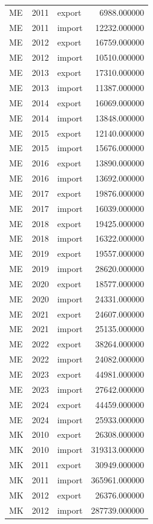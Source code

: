 \begin{tabular}{lrlr}
ME & 2011 & export & 6988.000000 \\
ME & 2011 & import & 12232.000000 \\
ME & 2012 & export & 16759.000000 \\
ME & 2012 & import & 10510.000000 \\
ME & 2013 & export & 17310.000000 \\
ME & 2013 & import & 11387.000000 \\
ME & 2014 & export & 16069.000000 \\
ME & 2014 & import & 13848.000000 \\
ME & 2015 & export & 12140.000000 \\
ME & 2015 & import & 15676.000000 \\
ME & 2016 & export & 13890.000000 \\
ME & 2016 & import & 13692.000000 \\
ME & 2017 & export & 19876.000000 \\
ME & 2017 & import & 16039.000000 \\
ME & 2018 & export & 19425.000000 \\
ME & 2018 & import & 16322.000000 \\
ME & 2019 & export & 19557.000000 \\
ME & 2019 & import & 28620.000000 \\
ME & 2020 & export & 18577.000000 \\
ME & 2020 & import & 24331.000000 \\
ME & 2021 & export & 24607.000000 \\
ME & 2021 & import & 25135.000000 \\
ME & 2022 & export & 38264.000000 \\
ME & 2022 & import & 24082.000000 \\
ME & 2023 & export & 44981.000000 \\
ME & 2023 & import & 27642.000000 \\
ME & 2024 & export & 44459.000000 \\
ME & 2024 & import & 25933.000000 \\
MK & 2010 & export & 26308.000000 \\
MK & 2010 & import & 319313.000000 \\
MK & 2011 & export & 30949.000000 \\
MK & 2011 & import & 365961.000000 \\
MK & 2012 & export & 26376.000000 \\
MK & 2012 & import & 287739.000000 \\

\end{tabular}
